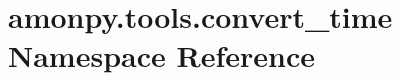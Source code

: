 \hypertarget{namespaceamonpy_1_1tools_1_1convert__time}{\section{amonpy.\-tools.\-convert\-\_\-time Namespace Reference}
\label{namespaceamonpy_1_1tools_1_1convert__time}
}
